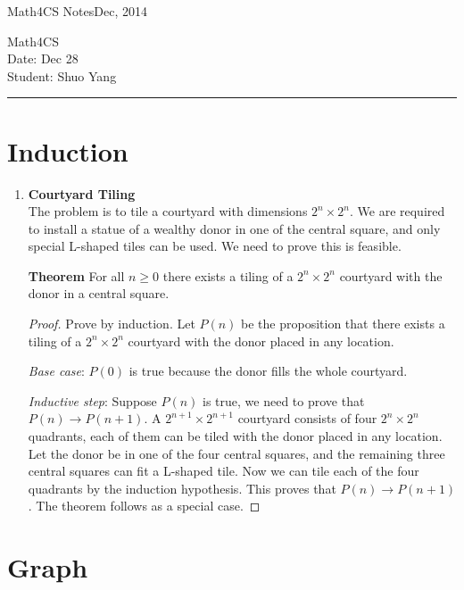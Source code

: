 \documentclass[11pt]{article}
\def\CourseCode{Math4CS Notes}
\def\DateHandedOut{Dec, 2014}
\def\DateDue{Dec 28}
\def\Author{Shuo Yang}
\begin{document}
\noindent

\CourseCode \hfill \DateHandedOut

\begin{center}
Math4CS\\
Date: \DateDue\\
Student: \Author\\
\end{center}

\hrule\smallskip

\section{Induction}

\begin{enumerate}

\item \textbf{Courtyard Tiling}\\

  The problem is to tile a courtyard with dimensions $2^n \times
  2^n$. We are required to install a statue of a wealthy donor in one
  of the central square, and only special L-shaped tiles can be
  used. We need to prove this is feasible.
  
  \textbf{Theorem} For all $n \geq 0$ there exists a tiling of a $2^n
  \times 2^n$ courtyard with the donor in a central square. 
  \begin{proof}
    Prove by induction. Let $P(n)$ be the proposition that there
    exists a tiling of a $2^n \times 2^n$ courtyard with the donor
    placed in any location.

  \emph{Base case}: $P(0)$ is true because the donor fills the whole
  courtyard.

  \emph{Inductive step}: Suppose $P(n)$ is true, we need to prove that
  $P(n) \rightarrow P(n+1)$. A $2^{n+1} \times 2^{n+1}$ courtyard
  consists of four $2^n \times 2^n$ quadrants, each of them can be tiled
  with the donor placed in any location. Let the donor be in one of
  the four central squares, and the remaining three central squares
  can fit a L-shaped tile. Now we can tile each of the four quadrants
  by the induction hypothesis. This proves that $P(n) \rightarrow
  P(n+1)$. The theorem follows as a special case.
  \end{proof}

\end{enumerate}

\section{Graph}
\end{document}
